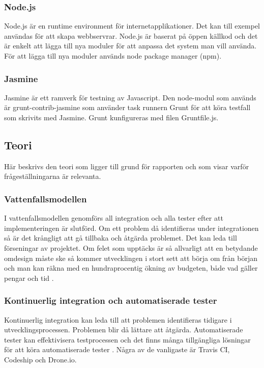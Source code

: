 \subsubsection{Node.js}
Node.js är en runtime environment för internetapplikationer. Det kan till exempel 
användas för att skapa webbservrar.
Node.js är baserat på öppen källkod och det är enkelt att lägga till nya 
moduler för att anpassa det system man vill
använda. För att lägga till nya moduler används node package manager (npm).

\subsubsection{Jasmine}
Jasmine är ett ramverk för testning av Javascript. 
Den node-modul som används är grunt-contrib-jasmine som använder task runnern Grunt 
för att köra testfall som skrivits med Jasmine.
Grunt kunfigureras med filen Gruntfile.js.

\subsection{Teori}
Här beskrivs den teori som ligger till grund för rapporten och som visar
varför frågeställningarna är relevanta.

\subsubsection{Vattenfallsmodellen}
I vattenfallsmodellen genomförs all integration och alla tester efter att implementeringen är slutförd. 
Om ett problem då identifieras under integrationen så är det krångligt att gå 
tillbaka och åtgärda problemet. 
Det kan leda till förseningar av projektet.
Om felet som upptäcks är så allvarligt att en betydande omdesign måste ske så
kommer utvecklingen i stort sett att börja om från början och man kan räkna 
med en hundraprocentig ökning av budgeten, 
både vad gäller pengar och tid \cite{Royce}.

\subsubsection{Kontinuerlig integration och automatiserade tester}
Kontinuerlig integration kan leda till att problemen identifieras tidigare i 
utvecklingsprocessen. Problemen blir då lättare att åtgärda. Automatiserade tester kan effektivisera 
testprocessen och det finns många tillgängliga lösningar för att köra automatiserade
tester \cite{Karlsson}.
Några av de vanligaste är Travis CI, Codeship och Drone.io.


